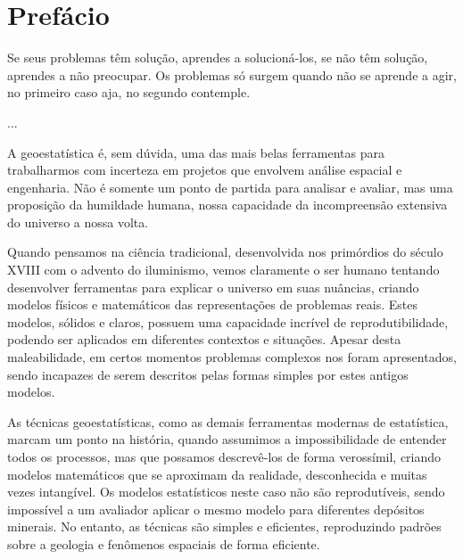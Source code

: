 \documentclass[12pt,fleqn]{book} %
\newcommand*{\myquotingsource}{}
\newenvironment{myquoting}[1]{%
	\renewcommand*{\myquotingsource}{#1}
	\begin{quoting}[font={itshape,raggedleft},leftmargin=0.5\linewidth,rightmargin=2em]%
	}{%
		\par\medskip
		\myquotingsource
	\end{quoting}%
}
\begin{document}

\pagestyle{empty} %

\tableofcontents %

\cleardoublepage %

\pagestyle{fancy} %




\chapter{Prefácio}

\begin{myquoting}{...}
	Se seus problemas têm solução, aprendes a solucioná-los, se não têm solução, aprendes a não preocupar. Os problemas só surgem quando não se aprende a agir, no primeiro caso aja, no segundo contemple.
\end{myquoting}

A geoestatística é, sem dúvida, uma das mais belas ferramentas para trabalharmos com incerteza em projetos que envolvem análise espacial e engenharia. Não é somente um ponto de partida para analisar e avaliar, mas uma proposição da humildade humana, nossa capacidade da incompreensão extensiva do universo a nossa volta. 

Quando pensamos na ciência tradicional, desenvolvida nos primórdios do século XVIII com o advento do iluminismo, vemos claramente o ser humano tentando desenvolver ferramentas para explicar o universo em suas nuâncias, criando modelos físicos e matemáticos das representações de problemas reais. Estes modelos, sólidos e claros, possuem uma capacidade incrível de reprodutibilidade, podendo ser aplicados em diferentes contextos e situações. Apesar desta maleabilidade, em certos momentos problemas complexos nos foram apresentados, sendo incapazes de serem descritos pelas formas simples por estes antigos modelos. 

As técnicas geoestatísticas, como as demais ferramentas modernas de estatística, marcam um ponto na história, quando assumimos a impossibilidade de entender todos os processos, mas que possamos descrevê-los de forma verossímil, criando modelos matemáticos que se aproximam da realidade, desconhecida e muitas vezes intangível. Os modelos estatísticos neste caso não são reprodutíveis, sendo impossível a um avaliador aplicar o mesmo modelo para diferentes depósitos minerais. No entanto, as técnicas são simples e eficientes, reproduzindo padrões sobre a geologia e fenômenos espaciais de forma eficiente.
\end{document}
